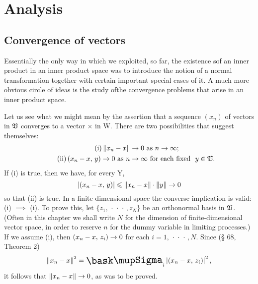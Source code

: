 \chapter{Analysis}

\section{Convergence of vectors}

Essentially the only way in which we exploited, so far, the existence  sof an
inner product in an inner product space was to introduce the notion of a normal
transformation together with certain important special cases of it. A much more
obvious circle of ideas is the study ofthe convergence problems that arise in an
inner product space.

Let us see what we might mean by the assertion that a sequence \((x_n)\) of
vectors in \(\mathfrak{V}\) converges to a vector × in W. There are two possibilities
that suggest themselves:
\begin{align}
    \tag{i} \left\lVert x_n - x\right\rVert &\to 0 ~ \text{as} ~ n \to \infty;\\
    \tag{ii} \left(x_n - x,\,y\right) \to 0 ~ \text{as} ~ n &\to \infty ~ \text{for each fixed } ~ y \in \mathfrak{V}.
\end{align}
If (i) is true, then we have, for every Y,
\begin{equation*}
    \left\lvert\left(x_n - x,\,y\right)\right\rvert \leqslant \left\lVert x_n - x\right\rVert\cdot \left\lVert y\right\rVert \to 0
\end{equation*}
so that (ii) is true. In a finite-dimensional space the converse implication is
valid: (i) \(\implies\) (i). To prove this, let \(\{z_1,
\,\cdot\,\cdot\,\cdot\,, z_N\}\) be an orthonormal basis in \(\mathfrak{V}\). (Often
in this chapter we shall write \(N\) for the dimension of finite-dimensional
vector space, in order to reserve \(n\) for the dummy variable in limiting
processes.) If we assume (i), then \(\left(x_n - x,\,z_i\right) \to 0\) for each
\(i = 1, \,\cdot\,\cdot\,\cdot\,, N\). Since (§ 68, Theorem 2)
\begin{equation*}
    \norm{x_n - x}^2 = \sumx_i \abs{\innerprod{x_n - x}{z_i}}^2,
\end{equation*}
it follows that \(\left\lVert x_n - x\right\rVert \to 0\), as was to be proved.

